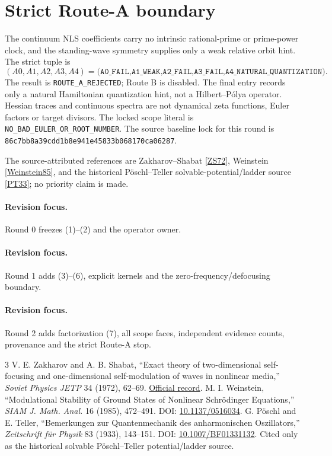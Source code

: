 \documentclass[9pt]{extarticle}
\begin{document}
\section{Strict Route-A boundary}
The continuum NLS coefficients carry no intrinsic rational-prime or
prime-power clock, and the standing-wave symmetry supplies only a weak relative
orbit hint.  The strict tuple is
\[
 (A0,A1,A2,A3,A4)=\texttt{(A0\_FAIL,A1\_WEAK,A2\_FAIL,A3\_FAIL,}
 \texttt{A4\_NATURAL\_QUANTIZATION)}.
\]
The result is \texttt{ROUTE\_A\_REJECTED}; Route B is disabled.  The final
entry records only a natural Hamiltonian quantization hint, not a
Hilbert--Pólya operator.  Hessian traces and continuous spectra are not
dynamical zeta functions, Euler factors or target divisors.
The locked scope literal is
\texttt{NO\_BAD\_EULER\_OR\_ROOT\_NUMBER}.
The source baseline lock for this round is
\texttt{86c7bb8a39cdd1b8e941e45833b068170ca06287}.

The source-attributed references are Zakharov--Shabat
\href{https://www.jetp.ras.ru/cgi-bin/dn/e_034_01_0062}{[ZS72]}, Weinstein
\href{https://doi.org/10.1137/0516034}{[Weinstein85]}, and the historical
Pöschl--Teller solvable-potential/ladder source
\href{https://doi.org/10.1007/BF01331132}{[PT33]}; no priority claim is made.
\fi

\ifcase\CRevisionRound
\paragraph{Revision focus.} Round 0 freezes (1)--(2) and the operator owner.
\or
\paragraph{Revision focus.} Round 1 adds (3)--(6), explicit kernels and the
zero-frequency/defocusing boundary.
\or
\paragraph{Revision focus.} Round 2 adds factorization (7), all scope faces,
independent evidence counts, provenance and the strict Route-A stop.
\fi

\begin{thebibliography}{3}
\footnotesize
\setlength{\itemsep}{0pt}
 V. E. Zakharov and A. B. Shabat, ``Exact theory of two-dimensional
self-focusing and one-dimensional self-modulation of waves in nonlinear media,''
\emph{Soviet Physics JETP} 34 (1972), 62--69.
\href{https://www.jetp.ras.ru/cgi-bin/dn/e_034_01_0062}{Official record}.
 M. I. Weinstein, ``Modulational Stability of Ground States
of Nonlinear Schrödinger Equations,'' \emph{SIAM J. Math. Anal.} 16 (1985),
472--491. DOI: \href{https://doi.org/10.1137/0516034}{10.1137/0516034}.
 G. Pöschl and E. Teller, ``Bemerkungen zur
Quantenmechanik des anharmonischen Oszillators,'' \emph{Zeitschrift für Physik}
83 (1933), 143--151. DOI:
\href{https://doi.org/10.1007/BF01331132}{10.1007/BF01331132}.  Cited only as
the historical solvable Pöschl--Teller potential/ladder source.
\end{thebibliography}
\end{document}
